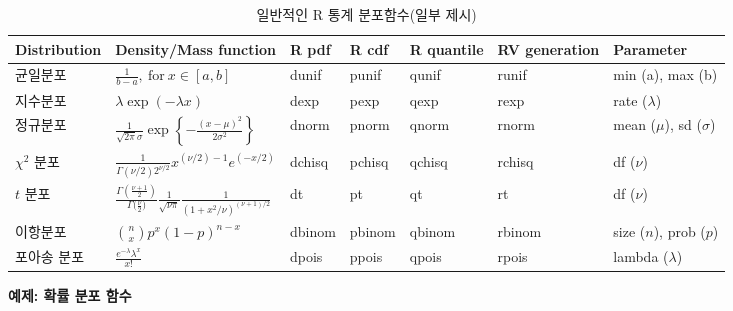 \documentclass[
  11pt,
]{krantz}
\begin{document}
\begin{table}

\caption{\label{tab:unnamed-chunk-7}일반적인 R 통계 분포함수(일부 제시)}
\centering
\fontsize{12}{14}\selectfont
\begin{tabu} to 
\hline
Distribution & Density/Mass function & R pdf & R cdf & R quantile & RV generation & Parameter\\
\hline
균일분포 & $\frac{1}{b -a},~\mathrm{for}~x \in [a, b]$ & dunif & punif & qunif & runif & min (a), max (b)\\
\hline
지수분포 & $\lambda \exp{(-\lambda x)}$ & dexp & pexp & qexp & rexp & rate ($\lambda$)\\
\hline
정규분포 & $\frac{1}{\sqrt{2\pi}\sigma}\exp \left\{-\frac{(x - \mu)^2}{2\sigma^2} \right \}$ & dnorm & pnorm & qnorm & rnorm & mean ($\mu$), sd ($\sigma$)\\
\hline
$\chi^2$ 분포 & $\frac{1}{\Gamma(\nu/2)2^{\nu/2}}x^{(\nu/2) - 1}e^{(-x/2)}$ & dchisq & pchisq & qchisq & rchisq & df ($\nu$)\\
\hline
$t$ 분포 & $\frac{\Gamma(\frac{\nu + 1}{2})}{\Gamma{(\frac{\nu}{2}})}\frac{1}{\sqrt{\nu\pi}}\frac{1}{(1 + x^2/\nu)^{(\nu + 1)/2}}$ & dt & pt & qt & rt & df ($\nu$)\\
\hline
이항분포 & ${n \choose x} p^x (1 - p)^{n - x}$ & dbinom & pbinom & qbinom & rbinom & size ($n$), prob ($p$)\\
\hline
포아송 분포 & $\frac{e^{-\lambda}\lambda^x}{x!}$ & dpois & ppois & qpois & rpois & lambda ($\lambda$)\\
\hline
\end{tabu}
\end{table}

\normalsize

\textbf{예제: 확률 분포 함수}

\footnotesize
\end{document}
